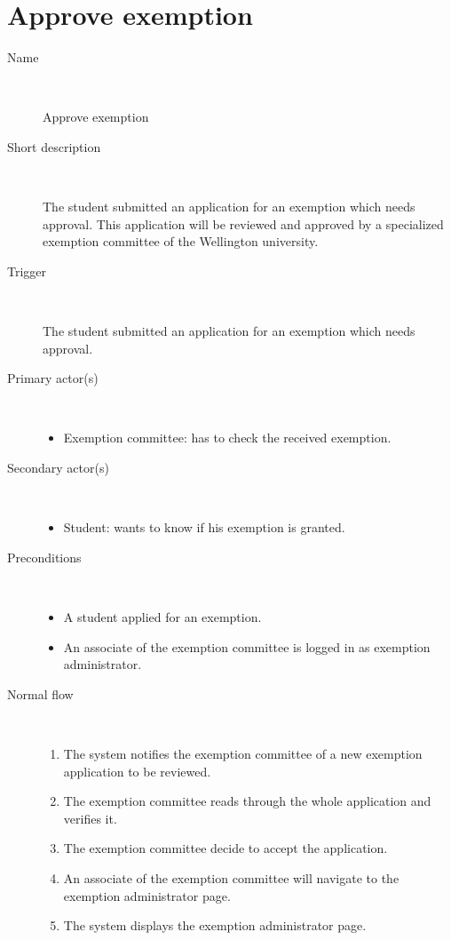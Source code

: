 \section{Approve exemption}

\begin{description}
	\item[Name] \
		\par Approve exemption
	\item[Short description] \ 
			\par The student submitted an application for an exemption which needs
			approval. This application will be reviewed and approved by a specialized
			exemption committee of the Wellington university.
	\item[Trigger] \ 
			\par The student submitted an application for an exemption which needs
			approval.
	\item[Primary actor(s)] \ 
		\begin{itemize}
		  \item Exemption committee: has to check the received exemption. 
		\end{itemize}
	\item[Secondary actor(s)] \ 
		\begin{itemize}
		  \item Student: wants to know if his exemption is granted.
		\end{itemize} 
	\item[Preconditions] \ 
	\begin{itemize}
		\item A student applied for an exemption.
		\item An associate of the exemption committee is logged in as exemption administrator.
	\end{itemize}
	\item[Normal flow] \ 
	\begin{enumerate}
	  	\item The system notifies the exemption committee of a new exemption
	  	application to be reviewed.
	  	\item The exemption committee reads through the whole application and
	  	verifies it.
	  	\item The exemption committee decide to accept the application.
	  	\item An associate of the exemption committee will navigate to the exemption
	  	administrator page.
	  	\item The system displays the exemption administrator page.

\end{enumerate}
\end{description}

